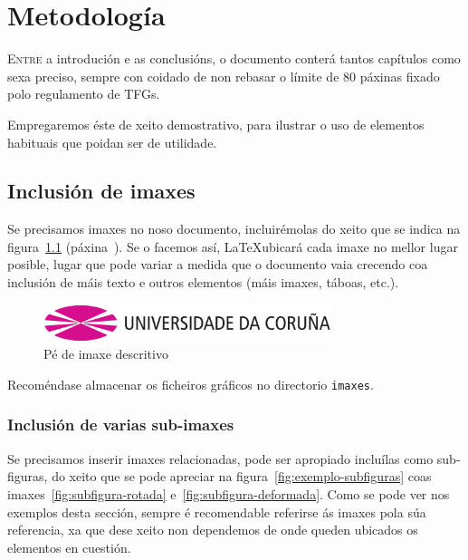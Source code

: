\chapter{Metodología}
\label{chap:demo}


\lettrine{E}{ntre} a introdución e as conclusións, o documento conterá
tantos capítulos como sexa preciso, sempre con coidado de non rebasar
o límite de 80 páxinas fixado polo regulamento de TFGs.

Empregaremos éste de xeito demostrativo, para ilustrar o uso de
elementos habituais que poidan ser de utilidade.

\section{Inclusión de imaxes}

Se precisamos imaxes no noso documento, incluirémolas do xeito que se
indica na figura~\ref{fig:exemplo} (páxina~\pageref{fig:exemplo}). Se
o facemos así, \LaTeX ubicará cada imaxe no mellor lugar posible,
lugar que pode variar a medida que o documento vaia crecendo coa
inclusión de máis texto e outros elementos (máis imaxes, táboas,
etc.).

\begin{figure}[hp!]
  \centering
  \includegraphics[width=0.75\textwidth]{imaxes/udc.png}
  \caption{Pé de imaxe descritivo}
  \label{fig:exemplo}
\end{figure}

Recoméndase almacenar os ficheiros gráficos no directorio
\texttt{imaxes}.

\subsection{Inclusión de varias sub-imaxes}

Se precisamos inserir imaxes relacionadas, pode ser apropiado
incluílas como sub-figuras, do xeito que se pode apreciar na
figura~\ref{fig:exemplo-subfiguras} coas
imaxes~\ref{fig:subfigura-rotada}
e~\ref{fig:subfigura-deformada}. Como se pode ver nos exemplos desta
sección, sempre é recomendable referirse ás imaxes pola súa
referencia, xa que dese xeito non dependemos de onde queden ubicados
os elementos en cuestión.

